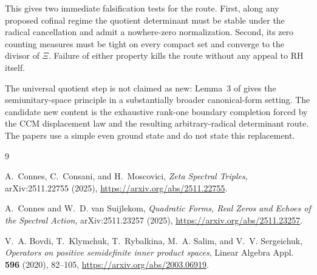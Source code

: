 \documentclass[11pt]{article}
\numberwithin{equation}{section}
\theoremstyle{definition}
\theoremstyle{remark}
\begin{document}
This gives two immediate falsification tests for the route.  First, along any proposed cofinal
regime the quotient determinant must be stable under the radical cancellation and admit a
nowhere-zero normalization.  Second, its zero counting measures must be tight on every compact
set and converge to the divisor of $\Xi$.  Failure of either property kills the route without any
appeal to RH itself.

The universal quotient step is not claimed as new: Lemma~3 of \cite{Bovdi2020} gives the
semiunitary-space principle in a substantially broader canonical-form setting.  The candidate new
content is the exhaustive rank-one boundary completion forced by the CCM displacement law and the
resulting arbitrary-radical determinant route.  The papers \cite{CCM2025,CvS2025} use a simple even
ground state and do not state this replacement.

\begin{thebibliography}{9}

A.~Connes, C.~Consani, and H.~Moscovici,
\emph{Zeta Spectral Triples}, arXiv:2511.22755 (2025),
\url{https://arxiv.org/abs/2511.22755}.

A.~Connes and W.~D. van Suijlekom,
\emph{Quadratic Forms, Real Zeros and Echoes of the Spectral Action},
arXiv:2511.23257 (2025),
\url{https://arxiv.org/abs/2511.23257}.

V.~A. Bovdi, T.~Klymchuk, T.~Rybalkina, M.~A. Salim, and V.~V. Sergeichuk,
\emph{Operators on positive semidefinite inner product spaces},
Linear Algebra Appl. \textbf{596} (2020), 82--105,
\url{https://arxiv.org/abs/2003.06919}.

\end{thebibliography}
\end{document}
